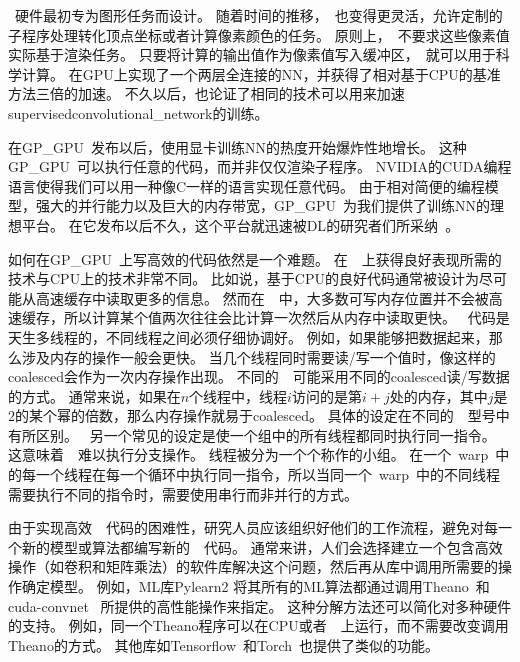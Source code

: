 ~硬件最初专为图形任务而设计。
随着时间的推移，~也变得更灵活，允许定制的子程序处理转化顶点坐标或者计算像素颜色的任务。
原则上，~不要求这些像素值实际基于渲染任务。
只要将计算的输出值作为像素值写入缓冲区，~就可以用于科学计算。
\citet{Steinkrau2005}在GPU上实现了一个两层全连接的\gls{NN}，并获得了相对基于CPU的基准方法三倍的加速。
不久以后，\citet{chellapilla:inria-00112631}也论证了相同的技术可以用来加速\gls{supervised}\gls{convolutional_network}的训练。


在\gls{GP_GPU}~发布以后，使用显卡训练\gls{NN}的热度开始爆炸性地增长。
这种\gls{GP_GPU}~可以执行任意的代码，而并非仅仅渲染子程序。
NVIDIA的CUDA编程语言使得我们可以用一种像C一样的语言实现任意代码。
由于相对简便的编程模型，强大的并行能力以及巨大的内存带宽，\gls{GP_GPU}~为我们提供了训练\gls{NN}的理想平台。
在它发布以后不久，这个平台就迅速被\gls{DL}的研究者们所采纳~\citep{RainaICML09-small,Ciresan-2010}。



如何在\gls{GP_GPU}~上写高效的代码依然是一个难题。
在~~上获得良好表现所需的技术与CPU上的技术非常不同。
比如说，基于CPU的良好代码通常被设计为尽可能从高速缓存中读取更多的信息。
然而在~~中，大多数可写内存位置并不会被高速缓存，所以计算某个值两次往往会比计算一次然后从内存中读取更快。
~代码是天生多线程的，不同线程之间必须仔细协调好。
例如，如果能够把数据起来，那么涉及内存的操作一般会更快。
当几个线程同时需要读/写一个值时，像这样的\gls{coalesced}会作为一次内存操作出现。
不同的~~可能采用不同的\gls{coalesced}读/写数据的方式。
通常来说，如果在$n$个线程中，线程$i$访问的是第$i+j$处的内存，其中$j$是$2$的某个幂的倍数，那么内存操作就易于\gls{coalesced}。
具体的设定在不同的~~型号中有所区别。
~另一个常见的设定是使一个组中的所有线程都同时执行同一指令。
这意味着~~难以执行分支操作。
线程被分为一个个称作的小组。
在一个~\gls{warp}~中的每一个线程在每一个循环中执行同一指令，所以当同一个~\gls{warp}~中的不同线程需要执行不同的指令时，需要使用串行而非并行的方式。


由于实现高效~~代码的困难性，研究人员应该组织好他们的工作流程，避免对每一个新的模型或算法都编写新的~~代码。
通常来讲，人们会选择建立一个包含高效操作（如卷积和矩阵乘法）的软件库解决这个问题，然后再从库中调用所需要的操作确定模型。
例如，\gls{ML}库Pylearn2 \citep{pylearn2_arxiv_2013}将其所有的\gls{ML}算法都通过调用Theano~\citep{bergstra+al:2010-scipy-short,Bastien-2012}和cuda-convnet~\citep{Krizhevsky2010tr} 所提供的高性能操作来指定。
这种分解方法还可以简化对多种硬件的支持。
例如，同一个Theano程序可以在CPU或者~~上运行，而不需要改变调用Theano的方式。
其他库如Tensorflow~\citep{tensorflow}和Torch~\citep{Torch-2011}也提供了类似的功能。


